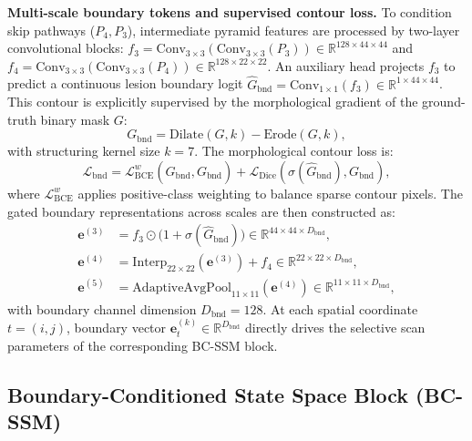 \documentclass[journal]{IEEEtran}
\newcommand{\R}{\mathbb{R}}
\newcommand{\vect}[1]{\bm{#1}}
\begin{document}
\textbf{Multi-scale boundary tokens and supervised contour loss.} To condition skip pathways ($P_4, P_3$), intermediate pyramid features are processed by two-layer convolutional blocks: $f_3 = \mathrm{Conv}_{3\times3}(\mathrm{Conv}_{3\times3}(P_3))\in\R^{128\times 44\times 44}$ and $f_4 = \mathrm{Conv}_{3\times3}(\mathrm{Conv}_{3\times3}(P_4))\in\R^{128\times 22\times 22}$. An auxiliary head projects $f_3$ to predict a continuous lesion boundary logit $\hat{G}_{\text{bnd}} = \mathrm{Conv}_{1\times1}(f_3)\in\R^{1\times 44\times 44}$. This contour is explicitly supervised by the morphological gradient of the ground-truth binary mask $G$:
\begin{equation}
  G_{\text{bnd}} = \mathrm{Dilate}(G, k) - \mathrm{Erode}(G, k),
  \label{eq:morph_target}
\end{equation}
with structuring kernel size $k=7$. The morphological contour loss is:
\begin{equation}
  \mathcal{L}_{\text{bnd}} = \mathcal{L}_{\text{BCE}}^{w}(\hat{G}_{\text{bnd}}, G_{\text{bnd}}) + \mathcal{L}_{\text{Dice}}(\sigma(\hat{G}_{\text{bnd}}), G_{\text{bnd}}),
  \label{eq:loss_bnd}
\end{equation}
where $\mathcal{L}_{\text{BCE}}^{w}$ applies positive-class weighting to balance sparse contour pixels. The gated boundary representations across scales are then constructed as:
\begin{align}
  \vect{e}^{(3)} &= f_3 \odot \big(1 + \sigma(\hat{G}_{\text{bnd}})\big) \in \R^{44\times 44\times D_{\text{bnd}}}, \label{eq:e3}\\
  \vect{e}^{(4)} &= \mathrm{Interp}_{22\times22}(\vect{e}^{(3)}) + f_4 \in \R^{22\times 22\times D_{\text{bnd}}}, \label{eq:e4}\\
  \vect{e}^{(5)} &= \mathrm{AdaptiveAvgPool}_{11\times11}(\vect{e}^{(4)}) \in \R^{11\times 11\times D_{\text{bnd}}}, \label{eq:e5}
\end{align}
with boundary channel dimension $D_{\text{bnd}}=128$. At each spatial coordinate $t=(i,j)$, boundary vector $\vect{e}_t^{(k)}\in\R^{D_{\text{bnd}}}$ directly drives the selective scan parameters of the corresponding BC-SSM block.

\subsection{Boundary-Conditioned State Space Block (BC-SSM)}
\label{sec:bcssm}
\end{document}
